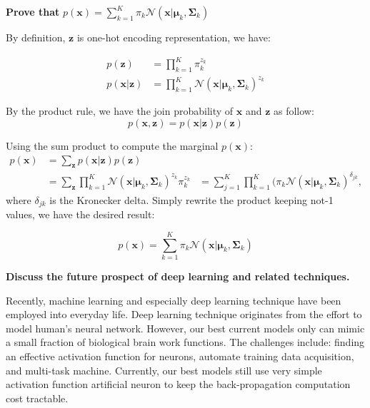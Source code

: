 \documentclass[12pt,twoside]{article}
\begin{document}
\begin{exercises}

\problem \textbf{Prove that} $p(\mathbf{x}) = \sum_{k=1}^{K} \pi_k \mathcal{N}(\mathbf{x}|\boldsymbol \mu_k,\boldsymbol \Sigma_k)$

\ifsolution \solution{}
By definition, $\mathbf{z}$ is one-hot encoding representation, we have:

\begin{equation*}
  \begin{aligned}
    p(\mathbf{z}) & = \prod^{K}_{k=1} \pi_k^{z_k} \\
    p(\mathbf{x}|\mathbf{z}) & = \prod^{K}_{k=1} \mathcal{N} (\mathbf{x}|\boldsymbol \mu_k, \boldsymbol \Sigma_k)^{z_k}
  \end{aligned}
\end{equation*}

By the product rule, we have the join probability of $\mathbf{x}$ and $\mathbf{z}$ as follow:
$$ p(\mathbf{x}, \mathbf{z}) = p(\mathbf{x}|\mathbf{z}) p(\mathbf{z}) $$

Using the sum product to compute the marginal $p(\mathbf{x})$:
\begin{equation*}
  \begin{aligned}
    p(\mathbf{x}) & = \sum_{\mathbf{z}} p(\mathbf{x}|\mathbf{z}) p(\mathbf{z})\\
                  & = \sum_{\mathbf{z}} \prod^{K}_{k=1} \mathcal{N} (\mathbf{x}|\boldsymbol \mu_k, \boldsymbol \Sigma_k)^{z_k} \pi_k^{z_k}
                  & = \sum_{j=1}^{K} \prod^{K}_{k=1} (\pi_k \mathcal{N}(\mathbf{x}|\boldsymbol \mu_k, \boldsymbol \Sigma_k)^{\delta_{jk}},
  \end{aligned}
\end{equation*}
where $\delta_{jk}$ is the Kronecker delta. Simply rewrite the product keeping not-1 values, we have the desired result:

$$ p(\mathbf{x}) = \sum_{k=1}^{K} \pi_k \mathcal{N}(\mathbf{x}|\boldsymbol \mu_k,\boldsymbol \Sigma_k) $$

\fi

\problem \textbf{Discuss the future prospect of deep learning and related techniques.}

\ifsolution \solution{}
Recently, machine learning and especially deep learning technique have been
employed into everyday life. Deep learning technique originates from the
effort to model human's neural network. However, our best current models only
can mimic a small fraction of biological brain work functions. The challenges
include: finding an effective activation function for neurons, automate training
data acquisition, and multi-task machine. Currently, our best models still use
very simple activation function artificial neuron to keep the back-propagation
computation cost tractable. 
\fi


\end{exercises}
\end{document}
